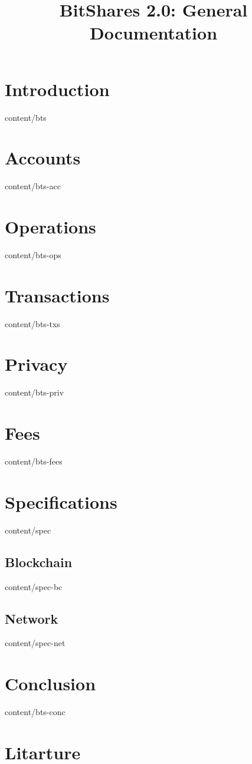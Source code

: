 \documentclass[conference,final,10pt,a4paper]{IEEEtran}
\title{BitShares 2.0: General Documentation}
\author{}
\begin{document}
\sloppy
\maketitle

\begin{abstract}
\end{abstract}
\section    { Introduction   }  { content/bts      } 
\section    { Accounts       }  { content/bts-acc  } 
\section    { Operations     }  { content/bts-ops  } 
\section    { Transactions   }  { content/bts-txs  } 
\section    { Privacy        }  { content/bts-priv } 
\section    { Fees           }  { content/bts-fees } 
\section    { Specifications }  { content/spec     } 
\subsection { Blockchain     }  { content/spec-bc  } 
\subsection { Network        }  { content/spec-net } 
\section    { Conclusion     }  { content/bts-conc } 
\section*   { Litarture      } 
\end{document}
